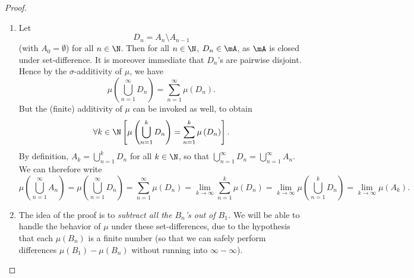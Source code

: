 \documentclass[pmath450]{subfiles}
\begin{document}
    \begin{proof}
        \begin{enumerate}
            \item Let
                \begin{equation*}
                    D_n = A_n\setminus A_{n-1}
                \end{equation*}
                (with $A_0=\emptyset$) for all $n\in\N$. Then for all $n\in\N$, $D_n\in\mA$, as $\mA$ is closed under set-difference. It is moreover immediate that $D_n$'s are pairwise disjoint. Hence by the $\sigma$-additivity of $\mu$, we have
                \begin{equation*}
                    \mu\left( \bigcup^{\infty}_{n=1}D_n \right) = \sum^{\infty}_{n=1}\mu\left( D_n \right).
                \end{equation*}
                But the (finite) additivity of $\mu$ can be invoked as well, to obtain
                \begin{equation*}
                    \forall k\in\N\left[ \mu\left( \bigcup^{k}_{n=1}D_n \right)=\sum^{k}_{n=1}\mu\left( D_n \right) \right].
                \end{equation*}
                By definition, $A_k=\bigcup^{k}_{n=1}D_n$ for all $k\in\N$, so that $\bigcup^{\infty}_{n=1}D_n=\bigcup^{\infty}_{n=1}A_n$. We can therefore write
                \begin{equation*}
                    \mu\left( \bigcup^{\infty}_{n=1}A_n \right) = \mu\left( \bigcup^{\infty}_{n=1}D_n \right) = \sum^{\infty}_{n=1}\mu\left( D_n \right) = \lim_{k\to\infty}\sum^{k}_{n=1}\mu\left( D_n \right) = \lim_{k\to\infty}\mu\left( \bigcup^{k}_{n=1}D_n \right)=\lim_{k\to\infty}\mu\left( A_k \right).
                \end{equation*}

            \item The idea of the proof is to \textit{subtract all the $B_n$'s out of $B_1$.} We will be able to handle the behavior of $\mu$ under these set-differences, due to the hypothesis that each $\mu\left( B_n \right)$ is a finite number (so that we can safely perform differences $\mu\left( B_1 \right)-\mu\left( B_n \right)$ without running into $\infty-\infty$).


\end{enumerate}
\end{proof}
\end{document}
